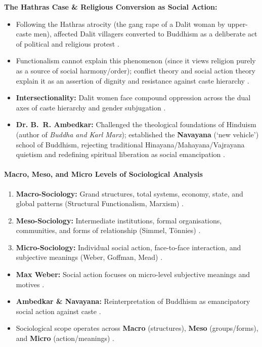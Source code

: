 \begin{CriticalPoint}
\textbf{The Hathras Case \& Religious Conversion as Social Action:}
\begin{itemize}
    \item Following the Hathras atrocity (the gang rape of a Dalit woman by upper-caste men), affected Dalit villagers converted to Buddhism as a deliberate act of political and religious protest .
    \item Functionalism cannot explain this phenomenon (since it views religion purely as a source of social harmony/order); conflict theory and social action theory explain it as an assertion of dignity and resistance against caste hierarchy .
    \item \textbf{Intersectionality:} Dalit women face compound oppression across the dual axes of caste hierarchy and gender subjugation .
    \item \textbf{Dr. B.~R. Ambedkar:} Challenged the theological foundations of Hinduism (author of \textit{Buddha and Karl Marx}); established the \textbf{Navayana} (`new vehicle') school of Buddhism, rejecting traditional Hinayana/Mahayana/Vajrayana quietism and redefining spiritual liberation as social emancipation .
\end{itemize}
\end{CriticalPoint}

\paragraph{Macro, Meso, and Micro Levels of Sociological Analysis}

\begin{KeyConcept}
\begin{enumerate}
    \item \textbf{Macro-Sociology:} Grand structures, total systems, economy, state, and global patterns (Structural Functionalism, Marxism) .
    \item \textbf{Meso-Sociology:} Intermediate institutions, formal organisations, communities, and forms of relationship (Simmel, Tönnies) .
    \item \textbf{Micro-Sociology:} Individual social action, face-to-face interaction, and subjective meanings (Weber, Goffman, Mead) .
\end{enumerate}
\end{KeyConcept}

\begin{QuickRevision}
\begin{itemize}
    \item \textbf{Max Weber:} Social action focuses on micro-level subjective meanings and motives .
    \item \textbf{Ambedkar \& Navayana:} Reinterpretation of Buddhism as emancipatory social action against caste .
    \item Sociological scope operates across \textbf{Macro} (structures), \textbf{Meso} (groups/forms), and \textbf{Micro} (action/meanings) .
\end{itemize}
\end{QuickRevision}

